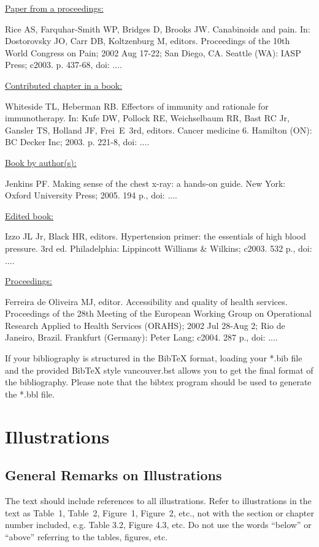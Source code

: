 \documentclass{IOS-Book-Article}
\begin{document}
\medskip
\noindent\ul{Paper from a proceedings:}\par\noindent
Rice AS, Farquhar-Smith WP, Bridges D, Brooks JW. Canabinoids and pain. In: Dostorovsky
JO, Carr DB, Koltzenburg M, editors. Proceedings of the 10th World Congress on Pain;
2002 Aug 17-22; San Diego, CA. Seattle (WA): IASP Press; c2003. p. 437-68, doi: ....

\medskip
\noindent\ul{Contributed chapter in a book:}\par\noindent
Whiteside TL, Heberman RB. Effectors of immunity and rationale for immunotherapy. In:
Kufe DW, Pollock RE, Weichselbaum RR, Bast RC Jr, Gansler TS, Holland JF, Frei~E~3rd,
editors. Cancer medicine 6. Hamilton (ON): BC Decker Inc; 2003. p. 221-8, doi: ....

\smallskip
\noindent\ul{Book by author(s):}\par\noindent
Jenkins PF. Making sense of the chest x-ray: a hands-on guide. New York: Oxford
University Press; 2005. 194 p., doi: ....

\smallskip
\noindent\ul{Edited book:}\par\noindent
Izzo JL Jr, Black HR, editors. Hypertension primer: the essentials of high blood pressure.
3rd ed. Philadelphia: Lippincott Williams \& Wilkins; c2003. 532 p., doi: ....

\smallskip
\noindent\ul{Proceedings:}\par\noindent
Ferreira de Oliveira MJ, editor. Accessibility and quality of health services. Proceedings of
the 28th Meeting of the European Working Group on Operational Research Applied to Health
Services (ORAHS); 2002 Jul 28-Aug 2; Rio de Janeiro, Brazil. Frankfurt (Germany): Peter Lang;
c2004. 287 p., doi: ....

\vspace*{6pt}
If your bibliography is structured in the BibTeX format, loading your *.bib file and the provided  BibTeX style vancouver.bst allows you to get the final format of the bibliography. Please note that the bibtex program should be used to generate the *.bbl file.

\section{Illustrations}

\subsection{General Remarks on Illustrations}
The text should include references to all illustrations. Refer to illustrations in the
text as Table~1, Table~2, Figure~1, Figure~2, etc., not with the section or chapter number
included, e.g. Table 3.2, Figure 4.3, etc. Do not use the words ``below'' or ``above''
referring to the tables, figures, etc.
\end{document}
